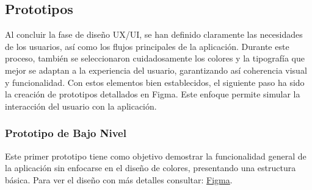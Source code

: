 
\subsection{Prototipos}

Al concluir la fase de diseño UX/UI, se han definido claramente las necesidades de los usuarios, así como los flujos principales de la aplicación. Durante este proceso, también se seleccionaron cuidadosamente los colores y la tipografía que mejor se adaptan a la experiencia del usuario, garantizando así coherencia visual y funcionalidad. Con estos elementos bien establecidos, el siguiente paso ha sido la creación de prototipos detallados en Figma. Este enfoque permite simular la interacción del usuario con la aplicación.

\subsubsection{Prototipo de Bajo Nivel}
Este primer prototipo tiene como objetivo demostrar la funcionalidad general de la aplicación sin enfocarse en el diseño de colores, presentando una estructura básica. Para ver el diseño con más detalles consultar: \href{https://www.figma.com/design/d7NOw36r1mUY7qDBIveJ2K/Se%C3%B1as-Chapinas?node-id=45-820&node-type=SECTION&t=luJsnsyUNaEJGP24-0}{Figma}.

